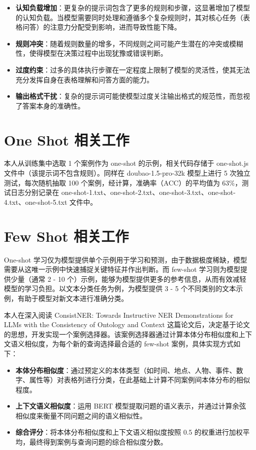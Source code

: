 \documentclass[12pt,a4paper]{ctexart}
\begin{document}
\begin{itemize}
  \item \textbf{认知负载增加}：更复杂的提示词包含了更多的规则和步骤，这显著增加了模型的认知负载。当模型需要同时处理和遵循多个复杂规则时，其对核心任务（表格问答）的注意力分配受到影响，进而导致性能下降。
  \item \textbf{规则冲突}：随着规则数量的增多，不同规则之间可能产生潜在的冲突或模糊性，使得模型在决策过程中出现犹豫或错误判断。
  \item \textbf{过度约束}：过多的具体执行步骤在一定程度上限制了模型的灵活性，使其无法充分发挥自身在表格理解和问答方面的能力。
  \item \textbf{输出格式干扰}：复杂的提示词可能使模型过度关注输出格式的规范性，而忽视了答案本身的准确性。
\end{itemize}

\section{One Shot 相关工作}
本人从训练集中选取 1 个案例作为 one-shot 的示例，相关代码存储于 one-shot.js 文件中（该提示词不包含规则）。同样在 doubao-1.5-pro-32k 模型上进行 5 次独立测试，每次随机抽取 100 个案例，经计算，准确率（ACC）的平均值为 63\%，测试日志分别记录在 one-shot-1.txt、one-shot-2.txt、one-shot-3.txt、one-shot-4.txt、one-shot-5.txt 文件中。

\section{Few Shot 相关工作}
One-shot 学习仅为模型提供单个示例用于学习和预测，由于数据极度稀缺，模型需要从这唯一示例中快速捕捉关键特征并作出判断。而 few-shot 学习则为模型提供少量（通常 2 - 10 个）示例，能够为模型提供更多的参考信息，从而有效减轻模型的学习负担。以文本分类任务为例，为模型提供 3 - 5 个不同类别的文本示例，有助于模型对新文本进行准确分类。

本人在深入阅读 ConsistNER: Towards Instructive NER Demonstrations for LLMs with the Consistency of Ontology and Context 这篇论文后，决定基于论文的思想，开发实现一个案例选择器。该案例选择器通过计算本体分布相似度和上下文语义相似度，为每个新的查询选择最合适的 few-shot 案例，具体实现方式如下：

\begin{itemize}
  \item \textbf{本体分布相似度}：通过预定义的本体类型（如时间、地点、人物、事件、数字、属性等）对表格列进行分类，在此基础上计算不同案例间本体分布的相似程度。
  \item \textbf{上下文语义相似度}：运用 BERT 模型提取问题的语义表示，并通过计算余弦相似度来衡量不同问题之间的语义相似性。
  \item \textbf{综合评分}：将本体分布相似度和上下文语义相似度按照 0.5 的权重进行加权平均，最终得到案例与查询问题的综合相似度分数。
\end{itemize}
\end{document}
